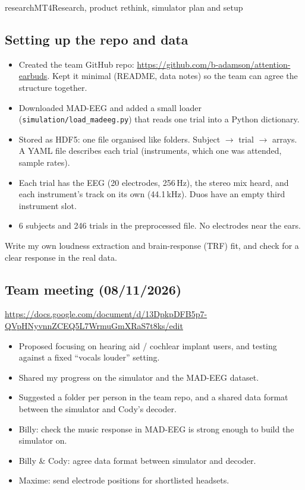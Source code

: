 \begin{entry}{research}{MT4}{Research, product rethink, simulator plan and setup}
\subsection*{Setting up the repo and data}
\begin{itemize}
  \item Created the team GitHub repo: \url{https://github.com/b-adamson/attention-earbuds}. Kept it minimal (README, data notes) so the team can agree the structure together.
  \item Downloaded MAD-EEG \cite{Cantisani2019} and added a small loader (\texttt{simulation/load\_madeeg.py}) that reads one trial into a Python dictionary.
\end{itemize}
\begin{itemize}
  \item Stored as HDF5: one file organised like folders. Subject $\rightarrow$ trial $\rightarrow$ arrays. A YAML file describes each trial (instruments, which one was attended, sample rates).
  \item Each trial has the EEG (20 electrodes, 256\,Hz), the stereo mix heard, and each instrument's track on its own (44.1\,kHz). Duos have an empty third instrument slot.
  \item 6 subjects and 246 trials in the preprocessed file. No electrodes near the ears.
\end{itemize}
Write my own loudness extraction and brain-response (TRF) fit, and check for a clear response in the real data.

\subsection*{Team meeting (08/11/2026)}
\url{https://docs.google.com/document/d/13DpkpDFB5p7-QVpHNyvnnZCEQ5L7WrmuGmXRaS7t8ks/edit}
\begin{itemize}
  \item Proposed focusing on hearing aid / cochlear implant users, and testing against a fixed ``vocals louder'' setting.
  \item Shared my progress on the simulator and the MAD-EEG dataset.
  \item Suggested a folder per person in the team repo, and a shared data format between the simulator and Cody's decoder.
\end{itemize}
\begin{itemize}
  \item Billy: check the music response in MAD-EEG is strong enough to build the simulator on.
  \item Billy \& Cody: agree data format between simulator and decoder.
  \item Maxime: send electrode positions for shortlisted headsets.
\end{itemize}
\end{entry}
